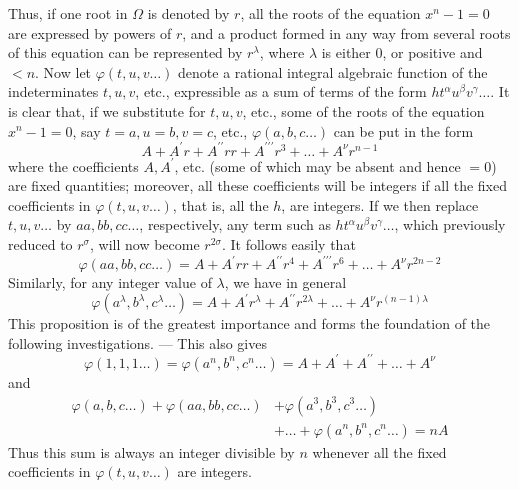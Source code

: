 \clearpage
{}
Thus, if one root in \(\Omega\) is denoted by \(r\), all the roots of the equation \(x^n-1=0\) are expressed by powers of \(r\), and a product formed in any way from several roots of this equation can be represented by \(r^\lambda\), where \(\lambda\) is either \(0\), or positive and \(<n\). Now let \(\varphi(t,\allowbreak u,\allowbreak v\ldots)\) denote a rational integral algebraic function of the indeterminates \(t,\allowbreak u,\allowbreak v\), etc., expressible as a sum of terms of the form \(ht^\alpha u^\beta v^\gamma\ldots\). It is clear that, if we substitute for \(t,\allowbreak u,\allowbreak v\), etc., some of the roots of the equation \(x^n-1=0\), say \(t=a,\allowbreak u=b,\allowbreak v=c\), etc., \(\varphi(a,\allowbreak b,\allowbreak c\ldots)\) can be put in the form \[A+A^{\prime} r+A^{\prime\prime} rr+A^{\prime\prime\prime} r^3+\ldots+A^\nu r^{n-1}\] where the coefficients \(A,\allowbreak A^{\prime}\), etc. (some of which may be absent and hence \(=0\)) are fixed quantities; moreover, all these coefficients will be integers if all the fixed coefficients in \(\varphi(t,\allowbreak u,\allowbreak v\ldots)\), that is, all the
\(h\), are integers. If we then replace \(t,\allowbreak u,\allowbreak v\ldots\) by \(aa,\allowbreak bb,\allowbreak cc\ldots\), respectively, any term such as \(ht^\alpha u^\beta v^\gamma\ldots\), which previously reduced to \(r^\sigma\), will now become \(r^{2\sigma}\). It follows easily that \[\varphi(aa,bb,cc\ldots)=A+A^{\prime} rr+A^{\prime\prime} r^4+A^{\prime\prime\prime} r^6+\ldots+A^\nu r^{2n-2}\] Similarly, for any integer value of \(\lambda\), we have in general \[\varphi(a^\lambda,b^\lambda,c^\lambda\ldots)=A+A^{\prime} r^\lambda+A^{\prime\prime} r^{2\lambda}+\ldots+A^\nu r^{(n-1)\lambda}\] This proposition is of the greatest importance and forms the foundation of the following investigations. — This also gives \[\varphi(1,1,1\ldots)=\varphi(a^n,b^n,c^n\ldots)=A+A^{\prime}+A^{\prime\prime}+\ldots+A^\nu\] and \[\begin{aligned}
\varphi(a,b,c\ldots)+\varphi(aa,bb,cc\ldots)&+\varphi(a^3,b^3,c^3\ldots)\\
&+\ldots+\varphi(a^n,b^n,c^n\ldots)=nA
\end{aligned}\] Thus this sum is always an integer divisible by \(n\) whenever all the fixed coefficients in \(\varphi(t,\allowbreak u,\allowbreak v\ldots)\) are integers.

